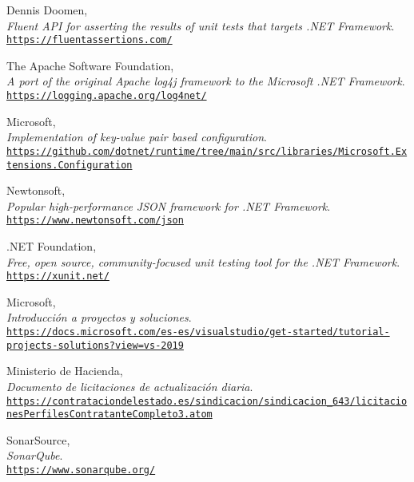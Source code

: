 \begin{thebibliography}{X}
            Dennis Doomen,
            \\ \textit{Fluent API for asserting the results of unit tests that targets .NET Framework}.
            \\ \texttt{\url{https://fluentassertions.com/}}
        
            The Apache Software Foundation,
            \\ \textit{A port of the original Apache log4j framework to the Microsoft .NET Framework}.
            \\ \texttt{\url{https://logging.apache.org/log4net/}}
        
            Microsoft,
            \\ \textit{Implementation of key-value pair based configuration}.
            \\ \texttt{\url{https://github.com/dotnet/runtime/tree/main/src/libraries/Microsoft.Extensions.Configuration}}
        
            Newtonsoft,
            \\ \textit{Popular high-performance JSON framework for .NET Framework}.
            \\ \texttt{\url{https://www.newtonsoft.com/json}}
        
            .NET Foundation,
            \\ \textit{Free, open source, community-focused unit testing tool for the .NET Framework}.
            \\ \texttt{\url{https://xunit.net/}}
        
            Microsoft,
            \\ \textit{Introducción a proyectos y soluciones}.
            \\ \texttt{\url{https://docs.microsoft.com/es-es/visualstudio/get-started/tutorial-projects-solutions?view=vs-2019}}
        
            Ministerio de Hacienda,
            \\ \textit{Documento de licitaciones de actualización diaria}.
            \\ \texttt{\url{https://contrataciondelestado.es/sindicacion/sindicacion\_643/licitacionesPerfilesContratanteCompleto3.atom}}
            
            SonarSource,
            \\ \textit{SonarQube}.
            \\ \texttt{\url{https://www.sonarqube.org/}}
        

\end{thebibliography}
